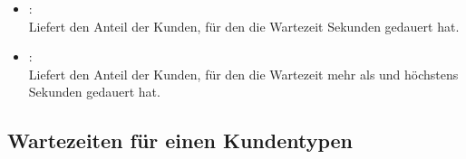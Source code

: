 \begin{itemize}
\item
{}:\\
Liefert den Anteil der Kunden, für den die Wartezeit  Sekunden gedauert hat.

\item
{}:\\
Liefert den Anteil der Kunden, für den die Wartezeit mehr als  und höchstens  Sekunden gedauert hat.

\end{itemize}  



\subsection{Wartezeiten für einen Kundentypen}

